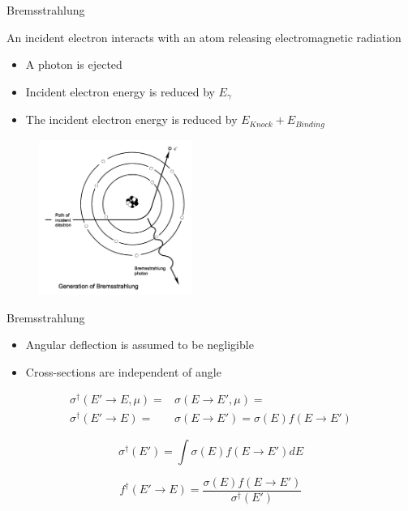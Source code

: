 \documentclass{beamer}
\begin{document}
    \begin{frame}{Bremsstrahlung}

  \begin{block}{An incident electron interacts with an atom releasing electromagnetic radiation}
    \begin{itemize}
      \item A photon is ejected
      \item Incident electron energy is reduced by $E_{\gamma}$
      \item The incident electron energy is reduced by $E_{Knock} + E_{Binding}$
    \end{itemize}
  \end{block}
  
      \begin{figure}
     \includegraphics[width=50mm]{brem.png}
   \end{figure}


\end{frame}

\begin{frame}{Bremsstrahlung}
	\begin{itemize}
	\item Angular deflection is assumed to be negligible
	\item Cross-sections are independent of angle
	\end{itemize}

\begin{align}
\sigma^{\dagger}(E' \rightarrow E, \mu) = & \sigma(E \rightarrow E', \mu) =\nonumber \\
\sigma^{\dagger}(E' \rightarrow E) = & \sigma(E \rightarrow E') = \sigma(E)f(E \rightarrow E')
\end{align}

\begin{equation}
\sigma^{\dagger}(E') = \int\sigma(E)f(E \rightarrow E')dE
\end{equation}

\begin{equation}
f^{\dagger}(E' \rightarrow E) = \frac{\sigma(E)f(E \rightarrow E')}{\sigma^{\dagger}(E')}
\end{equation}


\end{frame}
\end{document}

